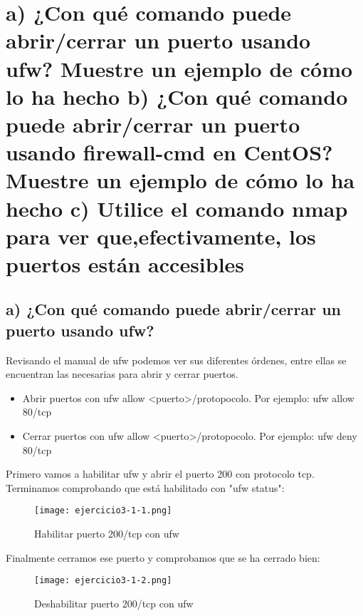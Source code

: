 	
	
	\section{a) ¿Con qué comando puede abrir/cerrar un puerto usando ufw? Muestre un ejemplo de cómo lo ha hecho b) ¿Con qué comando puede abrir/cerrar un puerto usando firewall-cmd en CentOS? Muestre un ejemplo de cómo lo ha hecho c) Utilice el comando nmap para ver que,efectivamente, los puertos están accesibles}
	
	

	\subsection{a) ¿Con qué comando puede abrir/cerrar un puerto usando ufw?}
	
	Revisando el manual de ufw\cite{ejercicio3-1} podemos ver sus diferentes órdenes, entre ellas se encuentran las necesarias para abrir y cerrar puertos.
	
	\begin{itemize}
		\item Abrir puertos con ufw allow <puerto>/protopocolo. Por ejemplo: ufw allow 80/tcp
		\item Cerrar puertos con ufw allow <puerto>/protopocolo. Por ejemplo: ufw deny 80/tcp 
	\end{itemize}
	
	Primero vamos a habilitar ufw y abrir el puerto 200 con protocolo tcp. Terminamos comprobando que está habilitado con "ufw status":
	
	\begin{figure}[H] 
		\centering
		\texttt{[image: ejercicio3-1-1.png]} 
		\label{figura21} 
		
		\caption{Habilitar puerto 200/tcp con ufw}
	\end{figure}
	
	Finalmente cerramos ese puerto y comprobamos que se ha cerrado bien:
	
	\begin{figure}[H] 
		\centering
		\texttt{[image: ejercicio3-1-2.png]} 
		\label{figura22} 
		
		\caption{Deshabilitar puerto 200/tcp con ufw}
	\end{figure}
	
